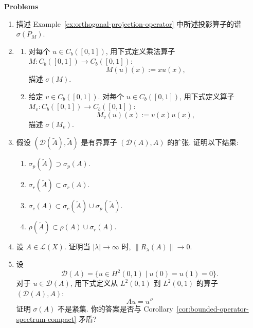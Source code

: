 \textbf{Problems}

\begin{enumerate}[label=\thesection.\arabic*.,ref=\thesection.\arabic*,start=17,series=book-problems]

\item\label{ex:orthogonal-projection-spectrum} 描述 Example~\ref{ex:orthogonal-projection-operator} 中所述投影算子的谱 $\sigma(P_M)$.

\item\label{ex:continuous-multiplication-operator-spectrum} \begin{enumerate}[label=(\alph*)]\item 对每个 $u\in C_b([0,1])$, 用下式定义乘法算子 $M:C_b([0,1])\to C_b([0,1])$:\[M(u)(x):=xu(x),\]描述 $\sigma(M)$.\item 给定 $v\in C_b([0,1])$. 对每个 $u\in C_b([0,1])$, 用下式定义算子 $M_v:C_b([0,1])\to C_b([0,1])$:\[M_v(u)(x):=v(x)u(x),\]描述 $\sigma(M_v)$.\end{enumerate}

\item\label{ex:bounded-operator-extension-spectral-inclusions} 假设 $(\mathcal{D}(\widetilde A),\widetilde A)$ 是有界算子 $(\mathcal{D}(A),A)$ 的扩张. 证明以下结果:\begin{enumerate}[label=(\alph*)]
\item $\sigma_p(\widetilde A)\supset\sigma_p(A)$.
\item $\sigma_r(\widetilde A)\subset\sigma_r(A)$.
\item $\sigma_c(A)\subset\sigma_c(\widetilde A)\cup\sigma_p(\widetilde A)$.
\item $\rho(\widetilde A)\subset\rho(A)\cup\sigma_r(A)$.
\end{enumerate}

\item\label{ex:bounded-operator-resolvent-decay-at-infinity} 设 $A\in\mathcal{L}(X)$. 证明当 $|\lambda|\to\infty$ 时, $\|R_\lambda(A)\|\to0$.

\item\label{ex:unbounded-second-derivative-noncompact-spectrum} 设\[\mathcal{D}(A)=\{u\in H^2(0,1)\mid u(0)=u(1)=0\}.\]对于 $u\in\mathcal{D}(A)$, 用下式定义从 $L^2(0,1)$ 到 $L^2(0,1)$ 的算子 $(\mathcal{D}(A),A)$:\[Au=u''\]证明 $\sigma(A)$ 不是紧集. 你的答案是否与 Corollary~\ref{cor:bounded-operator-spectrum-compact} 矛盾?


\end{enumerate}
